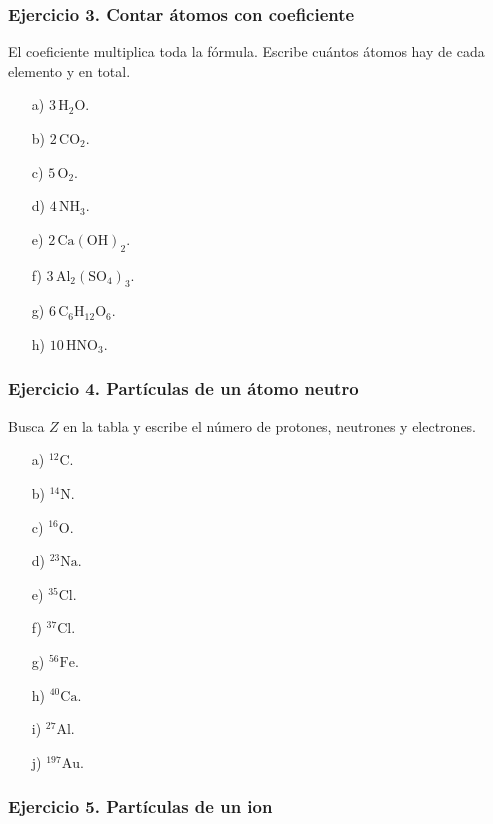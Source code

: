 \subsubsection*{Ejercicio 3. Contar átomos con coeficiente}

El coeficiente multiplica toda la fórmula.
Escribe cuántos átomos hay de cada elemento y en total.

\begin{enumerate}
    \item[a)] $3\,\mathrm{H_2O}$.
    \item[b)] $2\,\mathrm{CO_2}$.
    \item[c)] $5\,\mathrm{O_2}$.
    \item[d)] $4\,\mathrm{NH_3}$.
    \item[e)] $2\,\mathrm{Ca(OH)_2}$.
    \item[f)] $3\,\mathrm{Al_2(SO_4)_3}$.
    \item[g)] $6\,\mathrm{C_6H_{12}O_6}$.
    \item[h)] $10\,\mathrm{HNO_3}$.
\end{enumerate}

\subsubsection*{Ejercicio 4. Partículas de un átomo neutro}

Busca $Z$ en la tabla y escribe el número de protones, neutrones y electrones.

\begin{enumerate}
    \item[a)] ${}^{12}\mathrm{C}$.
    \item[b)] ${}^{14}\mathrm{N}$.
    \item[c)] ${}^{16}\mathrm{O}$.
    \item[d)] ${}^{23}\mathrm{Na}$.
    \item[e)] ${}^{35}\mathrm{Cl}$.
    \item[f)] ${}^{37}\mathrm{Cl}$.
    \item[g)] ${}^{56}\mathrm{Fe}$.
    \item[h)] ${}^{40}\mathrm{Ca}$.
    \item[i)] ${}^{27}\mathrm{Al}$.
    \item[j)] ${}^{197}\mathrm{Au}$.
\end{enumerate}

\subsubsection*{Ejercicio 5. Partículas de un ion}

